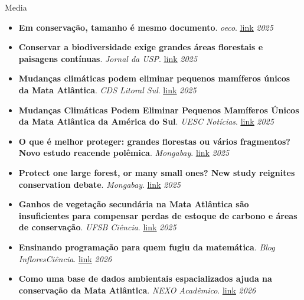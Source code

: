 \documentclass{resume}
\begin{document}
\begin{rSection}{Media}
\begin{itemize}
\item \textbf{Em conservação, tamanho é mesmo documento}. \textit{oeco}. \href{https://oeco.org.br/noticias/em-conservacao-tamanho-e-mesmo-documento/}{\underline{link}} \hfill{\em 2025}
\item \textbf{Conservar a biodiversidade exige grandes áreas florestais e paisagens contínuas}. \textit{Jornal da USP}. \href{https://jornal.usp.br/ciencias/conservar-a-biodiversidade-exige-grandes-areas-florestais-e-paisagens-continuas/}{\underline{link}} \hfill{\em 2025}
\item \textbf{Mudanças climáticas podem eliminar pequenos mamíferos únicos da Mata Atlântica}. \textit{CDS Litoral Sul}. \href{https://www.cdslitoralsul.ba.gov.br/Site/Noticias/mudanas-climticas-podem-eliminar-pequenos-mamferos-nicos-da-mata-atlntica-}{\underline{link}} \hfill{\em 2025}
\item \textbf{Mudanças Climáticas Podem Eliminar Pequenos Mamíferos Únicos da Mata Atlântica da América do Sul}. \textit{UESC Notícias}. \href{https://www2.uesc.br/noticias/1296/Mudancas-Climaticas-Podem-Eliminar-Pequenos-Mamiferos-Unicos-da-Mata-Atlantica-da-America-do-Sul/}{\underline{link}} \hfill{\em 2025}
\item \textbf{O que é melhor proteger: grandes florestas ou vários fragmentos? Novo estudo reacende polêmica}. \textit{Mongabay}. \href{https://brasil.mongabay.com/2025/06/o-que-e-melhor-proteger-grandes-florestas-ou-varios-fragmentos-novo-estudo-reacende-polemica/}{\underline{link}} \hfill{\em 2025}
\item \textbf{Protect one large forest, or many small ones? New study reignites conservation debate}. \textit{Mongabay}. \href{https://news.mongabay.com/2025/06/protect-one-large-forest-or-many-small-ones-new-study-reignites-conservation-debate}{\underline{link}} \hfill{\em 2025}
\item \textbf{Ganhos de vegetação secundária na Mata Atlântica são insuficientes para compensar perdas de estoque de carbono e áreas de conservação}. \textit{UFSB Ciência}. \href{https://ufsb.edu.br/ufsb-ciencia/5195-ganhos-de-vegetacao-secundaria-na-mata-atlantica-sao-insuficientes-para-compensar-perdas-de-estoque-de-carbono-e-areas-de-conservacao}{\underline{link}} \hfill{\em 2025}
\item \textbf{Ensinando programação para quem fugiu da matemática}. \textit{Blog InfloresCiência}. \href{https://infloresciencia.wordpress.com/2026/03/27/ensinando-programacao-para-quem-fugiu-da-matematica/}{\underline{link}} \hfill{\em 2026}
\item \textbf{Como uma base de dados ambientais espacializados ajuda na conservação da Mata Atlântica}. \textit{NEXO Acadêmico}. \href{https://pp.nexojornal.com.br/academico/2026/04/27/como-uma-base-de-dados-ambientais-espacializados-ajuda-na-conservacao-da-mata-atlantica}{\underline{link}} \hfill{\em 2026}
\end{itemize} 


\end{rSection}
\end{document}
